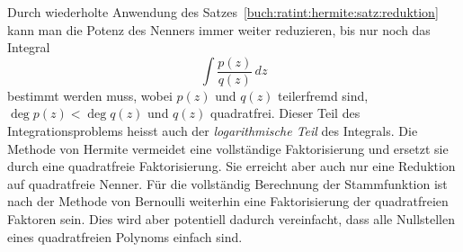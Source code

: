 Durch wiederholte Anwendung des
Satzes~\ref{buch:ratint:hermite:satz:reduktion}
kann man die Potenz des Nenners immer weiter reduzieren, bis
nur noch das Integral
\[
\int
\frac{p(z)}{q(z)}
\,dz
\]
bestimmt werden muss, wobei $p(z)$ und $q(z)$ teilerfremd sind,
$\deg p(z)<\deg q(z)$ und $q(z)$ quadratfrei.
Dieser Teil des Integrationsproblems heisst auch der 
\emph{logarithmische Teil} des Integrals.
%
Die Methode von Hermite vermeidet eine vollständige Faktorisierung
und ersetzt sie durch eine quadratfreie Faktorisierung.
Sie erreicht aber auch nur eine Reduktion auf quadratfreie Nenner.
Für die vollständig Berechnung der Stammfunktion ist nach der Methode
von Bernoulli weiterhin eine Faktorisierung der quadratfreien Faktoren
sein.
Dies wird aber potentiell dadurch vereinfacht, dass alle Nullstellen
eines quadratfreien Polynoms einfach sind.


